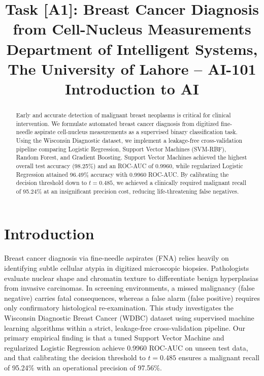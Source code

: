\documentclass[conference,10pt]{IEEEtran}
\begin{document}
\title{Task [A1]: Breast Cancer Diagnosis from Cell-Nucleus Measurements\\
\large Department of Intelligent Systems, The University of Lahore -- AI-101 Introduction to AI}

\author{
}

\maketitle

\begin{abstract}
Early and accurate detection of malignant breast neoplasms is critical for clinical intervention. We formulate automated breast cancer diagnosis from digitized fine-needle aspirate cell-nucleus measurements as a supervised binary classification task. Using the Wisconsin Diagnostic dataset, we implement a leakage-free cross-validation pipeline comparing Logistic Regression, Support Vector Machines (SVM-RBF), Random Forest, and Gradient Boosting. Support Vector Machines achieved the highest overall test accuracy (98.25\%) and an ROC-AUC of 0.9960, while regularized Logistic Regression attained 96.49\% accuracy with 0.9960 ROC-AUC. By calibrating the decision threshold down to $t = 0.485$, we achieved a clinically required malignant recall of 95.24\% at an insignificant precision cost, reducing life-threatening false negatives.
\end{abstract}

\section{Introduction}
Breast cancer diagnosis via fine-needle aspirates (FNA) relies heavily on identifying subtle cellular atypia in digitized microscopic biopsies. Pathologists evaluate nuclear shape and chromatin texture to differentiate benign hyperplasias from invasive carcinomas. In screening environments, a missed malignancy (false negative) carries fatal consequences, whereas a false alarm (false positive) requires only confirmatory histological re-examination. This study investigates the Wisconsin Diagnostic Breast Cancer (WDBC) dataset using supervised machine learning algorithms within a strict, leakage-free cross-validation pipeline. Our primary empirical finding is that a tuned Support Vector Machine and regularized Logistic Regression achieve 0.9960 ROC-AUC on unseen test data, and that calibrating the decision threshold to $t = 0.485$ ensures a malignant recall of 95.24\% with an operational precision of 97.56\%.
\end{document}
